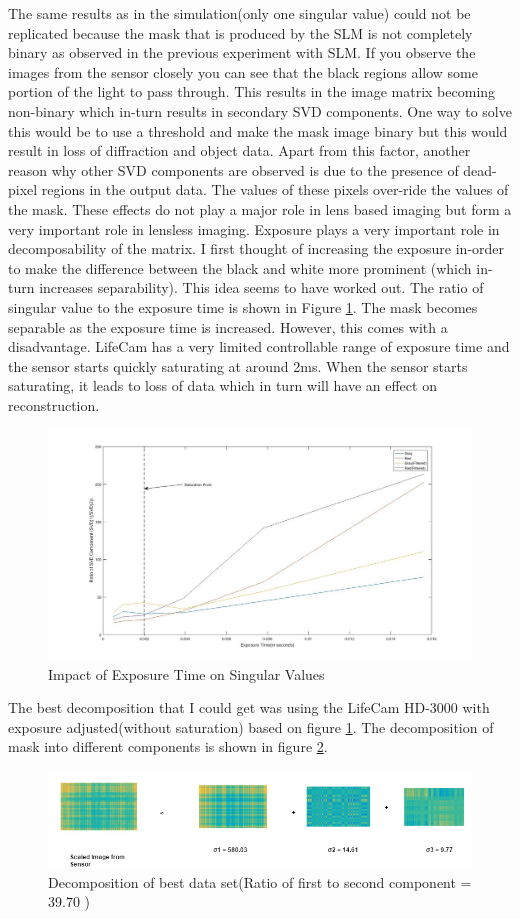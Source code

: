 The same results as in the simulation(only one singular value) could not be replicated because the mask that is produced by the SLM is not completely binary as observed in the previous experiment with SLM. If you observe the images from the sensor closely you can see that the black regions allow some portion of the light to pass through. This results in the image matrix becoming non-binary which in-turn results in secondary SVD components. One way to solve this would be to use a threshold and make the mask image binary but this would result in loss of diffraction and object data. Apart from this factor, another reason why other SVD components are observed is due to the presence of dead-pixel regions in the output data. The values of these pixels over-ride the values of the mask. These effects do not play a major role in lens based imaging but form a very important role in lensless imaging. Exposure plays a very important role in decomposability of the matrix. I first thought of increasing the exposure in-order to make the difference between the black and white more prominent (which in-turn increases separability). This idea seems to have worked out. The ratio of singular value to the exposure time is shown in Figure \ref{fig:svd_exposure}. The mask becomes separable as the exposure time is increased. However, this comes with a disadvantage. LifeCam has a very limited controllable range of exposure time and the sensor starts quickly saturating at around 2ms. When the sensor starts saturating, it leads to loss of data which in turn will have an effect on reconstruction. 
\begin{figure}[h]
\centering
\includegraphics[scale=0.35]{pics/slm/svd_graph_exposure.jpg}
\caption{Impact of Exposure Time on Singular Values}
\label{fig:svd_exposure}
\end{figure}
The best decomposition that I could get was using the LifeCam HD-3000 with exposure adjusted(without saturation) based on figure \ref{fig:svd_exposure}. The decomposition of mask into different components is shown in figure \ref{fig:svd_dec_exp}. 
\begin{figure}[ht]
\centering
\includegraphics[scale=0.50]{pics/slm/svd-decomp-exp.png}
\caption{Decomposition of best data set(Ratio of first to second component = 39.70 )}
\label{fig:svd_dec_exp}
\end{figure}